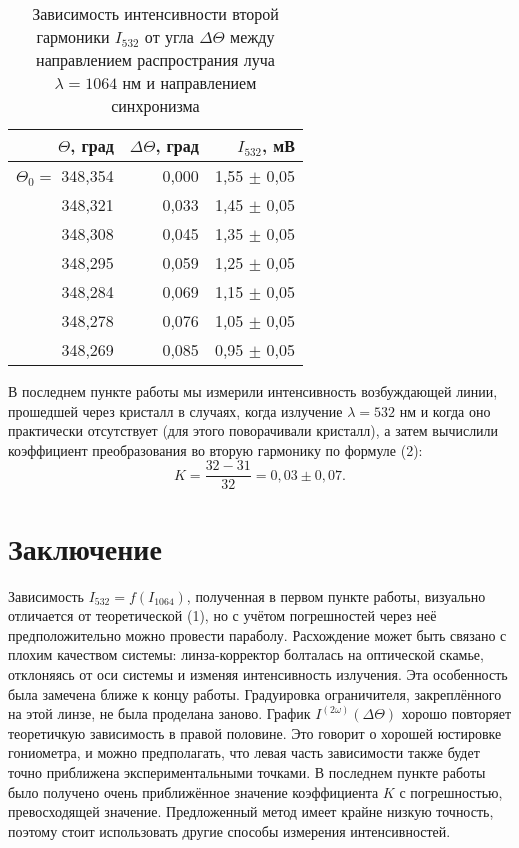 \begin{table}[H]
\centering
\begin{tabular}{|r|r|r|}
\hline
$\Theta$, град         & $\Delta \Theta$, град         &  $I_{532}$, мВ    \\ \hline \hline
$\Theta_0 = $ 348,354 & 0,000        & 1,55 $\pm$ 0,05  \\ \hline
348,321 & 0,033 & 1,45 $\pm$ 0,05 \\ \hline
348,308 & 0,045 & 1,35 $\pm$ 0,05 \\ \hline
348,295 & 0,059 & 1,25 $\pm$ 0,05 \\ \hline
348,284 & 0,069 & 1,15 $\pm$ 0,05 \\ \hline
348,278 & 0,076 & 1,05 $\pm$ 0,05 \\ \hline
348,269 & 0,085 & 0,95 $\pm$ 0,05 \\ \hline
\end{tabular}
\caption{Зависимость интенсивности второй гармоники $I_{532}$ от угла $\Delta \Theta$ между направлением распространия луча $\lambda = 1064$ нм и направлением синхронизма}
\end{table}

\n
В последнем пункте работы мы измерили интенсивность возбуждающей линии, прошедшей через кристалл в случаях, когда излучение $\lambda = 532$ нм и когда оно практически отсутствует (для этого поворачивали кристалл), а затем вычислили коэффициент преобразования во вторую гармонику по формуле (2):
\[K = \frac{32 - 31}{32} = 0,03 \pm 0,07.\]

\section*{Заключение}
Зависимость $I_{532} = f(I_{1064})$, полученная в первом пункте работы, визуально отличается от теоретической (1), но с учётом погрешностей через неё предположительно можно провести параболу. Расхождение может быть связано с плохим качеством системы: линза-корректор болталась на оптической скамье, отклоняясь от оси системы и изменяя интенсивность излучения. Эта особенность была замечена ближе к концу работы. Градуировка ограничителя, закреплённого на этой линзе, не была проделана заново.\n\n
График $I^{(2\omega)}(\Delta \Theta)$ хорошо повторяет теоретичкую зависимость в правой половине. Это говорит о хорошей юстировке гониометра, и можно предполагать, что левая часть зависимости также будет точно приближена экспериментальными точками.\n\n
В последнем пункте работы было получено очень приближённое значение коэффициента $K$ с погрешностью, превосходящей значение. Предложенный метод имеет крайне низкую точность, поэтому стоит использовать другие способы измерения интенсивностей.

